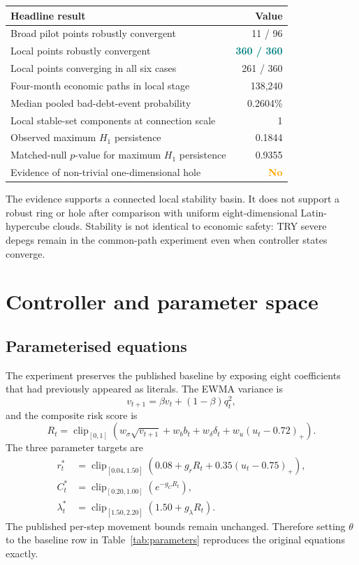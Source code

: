 \documentclass[11pt,a4paper]{article}
\newcommand{\good}[1]{\textcolor{teal}{\textbf{#1}}}
\newcommand{\warn}[1]{\textcolor{orange}{\textbf{#1}}}
\begin{document}
\begin{center}
\begin{tabular}{>{\raggedright\arraybackslash}p{}r}
\toprule
Headline result & Value\\
\midrule
Broad pilot points robustly convergent & 11 / 96\\
Local points robustly convergent & \good{360 / 360}\\
Local points converging in all six cases & 261 / 360\\
Four-month economic paths in local stage & 138,240\\
Median pooled bad-debt-event probability & 0.2604\%\\
Local stable-set components at connection scale & 1\\
Observed maximum $H_1$ persistence & 0.1844\\
Matched-null $p$-value for maximum $H_1$ persistence & 0.9355\\
Evidence of non-trivial one-dimensional hole & \warn{No}\\
\bottomrule
\end{tabular}
\end{center}

The evidence supports a connected local stability basin. It does not support a
robust ring or hole after comparison with uniform eight-dimensional
Latin-hypercube clouds. Stability is not identical to economic safety: TRY
severe depegs remain in the common-path experiment even when controller states
converge.

\section{Controller and parameter space}

\subsection{Parameterised equations}

The experiment preserves the published baseline by exposing eight coefficients
that had previously appeared as literals. The EWMA variance is
\begin{equation}
v_{t+1}=\beta v_t+(1-\beta)q_t^2,
\end{equation}
and the composite risk score is
\begin{equation}
R_t=\operatorname{clip}_{[0,1]}\left(
w_\sigma\sqrt{v_{t+1}}+w_b b_t+w_\delta\delta_t+
w_u(u_t-0.72)_+\right).
\end{equation}
The three parameter targets are
\begin{align}
r_t^*&=\operatorname{clip}_{[0.04,1.50]}
\left(0.08+g_rR_t+0.35(u_t-0.75)_+\right),\\
C_t^*&=\operatorname{clip}_{[0.20,1.00]}\left(e^{-g_CR_t}\right),\\
\lambda_t^*&=\operatorname{clip}_{[1.50,2.20]}
\left(1.50+g_\lambda R_t\right).
\end{align}
The published per-step movement bounds remain unchanged. Therefore setting
\(\theta\) to the baseline row in Table~\ref{tab:parameters} reproduces the
original equations exactly.
\end{document}

